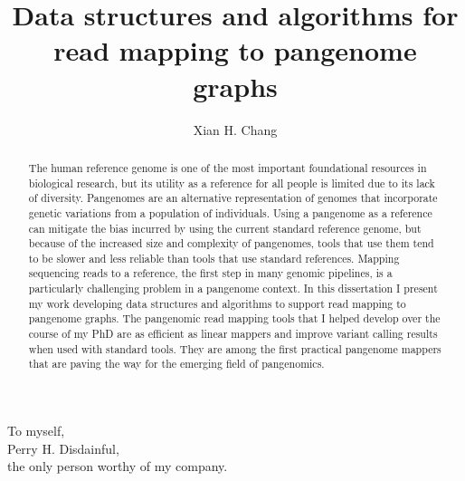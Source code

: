 \documentclass[11pt]{ucscthesis}
\begin{document}

\title{Data structures and algorithms for read mapping to pangenome graphs}
\author{Xian H. Chang}
\deanlinethree{}

\begin{frontmatter}

\maketitle
\copyrightpage

\tableofcontents
\listoffigures
\listoftables
\listofalgorithms

\begin{abstract}
The human reference genome is one of the most important foundational resources in biological research, but its utility as a reference for all people is limited due to its lack of diversity.
Pangenomes are an alternative representation of genomes that incorporate genetic variations from a population of individuals.
Using a pangenome as a reference can mitigate the bias incurred by using the current standard reference genome, but because of the increased size and complexity of pangenomes, tools that use them tend to be slower and less reliable than tools that use standard references.
Mapping sequencing reads to a reference, the first step in many genomic pipelines, is a particularly challenging problem in a pangenome context. 
In this dissertation I present my work developing data structures and algorithms to support read mapping to pangenome graphs.
The pangenomic read mapping tools that I helped develop over the course of my PhD are as efficient as linear mappers and improve variant calling results when used with standard tools.
They are among the first practical pangenome mappers that are paving the way for the emerging field of pangenomics.%


\end{abstract}

\begin{dedication}
\null\vfil
{\large
\begin{center}
To myself,\\\vspace{12pt}
Perry H. Disdainful,\\\vspace{12pt}
the only person worthy of my company.
\end{center}}
\vfil\null
\end{dedication}



\end{frontmatter}
\end{document}

